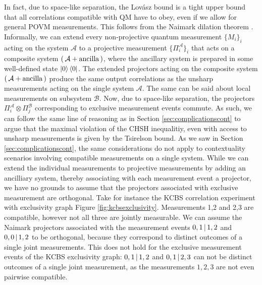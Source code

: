 In fact, due to space-like separation, the Lovász bound is a tight upper bound that all correlations compatible with QM have to obey, even if we allow for general POVM measurements. This follows from the Naimark dilation theorem \cite{Watrous2018}. Informally, we can extend every non-projective quantum measurement $\{M_i\}_i$ acting on the system $\mathcal{A}$ to a projective measurement $\{\Pi_i^{\mathcal{A}}\}_i$ that acts on a composite system $(\thinspace\mathcal{A}+\text{ancilla}\thinspace)$, where the ancillary system is prepared in some well-defined state $\ket{0}\bra{0}$. The extended projectors acting on the composite system $(\thinspace\mathcal{A}+\text{ancilla}\thinspace)$ produce the same output correlations as the unsharp measurements acting on the single system $\mathcal{A}$. The same can be said about local measurements on subsystem $\mathcal{B}$. Now, due to space-like separation, the projectors $\Pi_i^{\mathcal{A}}\otimes \Pi_j^{\mathcal{B}}$ corresponding to exclusive measurement events commute. As such, we can follow the same line of reasoning as in Section \ref{sec:complicationscont} to argue that the maximal violation of the CHSH inequalitiy, even with access to unsharp measurements is given by the Tsirelson bound. As we saw in Section \ref{sec:complicationscont}, the same considerations do not apply to contextuality scenarios involving compatible measurements on a single system. While we can extend the individual measurements to projective measurements by adding an ancilliary system, thereby associating with each measurement event a projector, we have no grounds to assume that the projectors associated with exclusive measurement are orthogonal. Take for instance the KCBS correlation experiment with exclusivity graph Figure \ref{fig:kcbsexclusivity}. Measurements 1,2 and 2,3 are compatible, however not all three are jointly measurable. We can assume the Naimark projectors associated with the measurement events $0,1\thinspace\vert\thinspace 1,2$ and $0,0\thinspace\vert\thinspace 1,2$ to be orthogonal, because they correspond to distinct outcomes of a single joint measurements. This does not hold for the exclusive measurement events of the KCBS exclusivity graph: $0,1\thinspace\vert\thinspace 1,2$ and $0,1\thinspace\vert\thinspace 2,3$ can not be distinct outcomes of a single joint measurement, as the measurements $1,2,3$ are not even pairwise compatible.

